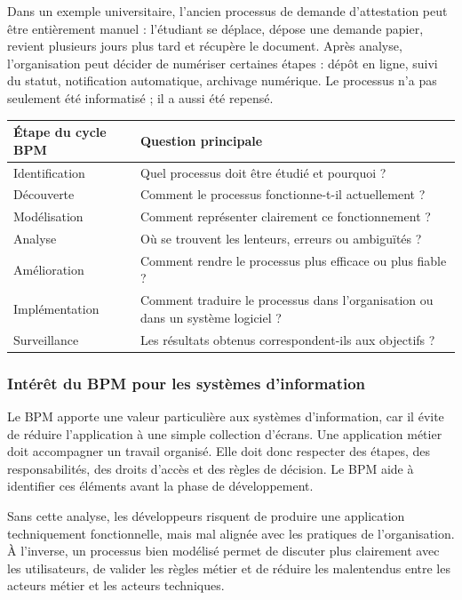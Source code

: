 Dans un exemple universitaire, l'ancien processus de demande d'attestation peut être entièrement manuel : l'étudiant se déplace, dépose une demande papier, revient plusieurs jours plus tard et récupère le document. Après analyse, l'organisation peut décider de numériser certaines étapes : dépôt en ligne, suivi du statut, notification automatique, archivage numérique. Le processus n'a pas seulement été informatisé ; il a aussi été repensé.

\begin{center}
\begin{tabular}{|p{3.5cm}|p{10.8cm}|}
\hline
\textbf{Étape du cycle BPM} & \textbf{Question principale} \\
\hline
Identification & Quel processus doit être étudié et pourquoi ? \\
\hline
Découverte & Comment le processus fonctionne-t-il actuellement ? \\
\hline
Modélisation & Comment représenter clairement ce fonctionnement ? \\
\hline
Analyse & Où se trouvent les lenteurs, erreurs ou ambiguïtés ? \\
\hline
Amélioration & Comment rendre le processus plus efficace ou plus fiable ? \\
\hline
Implémentation & Comment traduire le processus dans l'organisation ou dans un système logiciel ? \\
\hline
Surveillance & Les résultats obtenus correspondent-ils aux objectifs ? \\
\hline
\end{tabular}
\end{center}

\subsubsection{Intérêt du BPM pour les systèmes d'information}

Le BPM apporte une valeur particulière aux systèmes d'information, car il évite de réduire l'application à une simple collection d'écrans. Une application métier doit accompagner un travail organisé. Elle doit donc respecter des étapes, des responsabilités, des droits d'accès et des règles de décision. Le BPM aide à identifier ces éléments avant la phase de développement.

Sans cette analyse, les développeurs risquent de produire une application techniquement fonctionnelle, mais mal alignée avec les pratiques de l'organisation. À l'inverse, un processus bien modélisé permet de discuter plus clairement avec les utilisateurs, de valider les règles métier et de réduire les malentendus entre les acteurs métier et les acteurs techniques.

